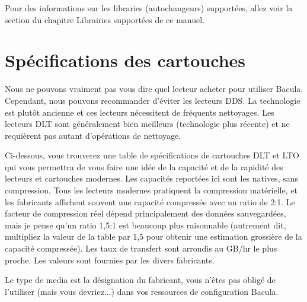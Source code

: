 Pour des informations sur les libraries (autochangeurs) support\'ees, allez
voir la section 
 du chapitre 
Librairies support\'ees de ce manuel. 

\section{Sp\'ecifications des cartouches}
Nous ne pouvons vraiment pas vous dire quel lecteur acheter pour utiliser Bacula. 
Cependant, nous pouvons recommander d'\'eviter les lecteurs DDS. La 
technologie est plut\^ot ancienne et ces lecteurs n\'ecessitent de fr\'equents 
nettoyages. Les lecteurs DLT sont g\'en\'eralement bien meilleurs (technologie 
plus r\'ecente) et ne requi\`erent pas autant d'op\'erations de nettoyage.

Ci-dessous, vous trouverez une table de sp\'ecifications de cartouches DLT et LTO 
qui vous permettra de vous faire une id\'ee de la capacit\'e et de la rapidit\'e des 
lecteurs et cartouches modernes. Les capacit\'es report\'ees ici sont les natives, 
sans compression. Tous les lecteurs modernes pratiquent la compression 
mat\'erielle, et les fabricants affichent souvent une capacit\'e compress\'ee avec un 
ratio de 2:1. Le facteur de compression r\'eel d\'epend principalement des donn\'ees 
sauvegard\'ees, mais je pense qu'un ratio 1,5:1 est beaucoup plus raisonnable 
(autrement dit, multipliez la valeur de la table par 1,5 pour obtenir une 
estimation grossi\`ere de la capacit\'e compress\'ee). Les taux de transfert sont 
arrondis au GB/hr le plus proche. Les valeurs sont fournies par les divers 
fabricants.

Le type de media est la d\'esignation du fabricant, vous n'\^etes pas oblig\'e de 
l'utiliser (mais vous devriez...) dans vos ressources de configuration Bacula.


